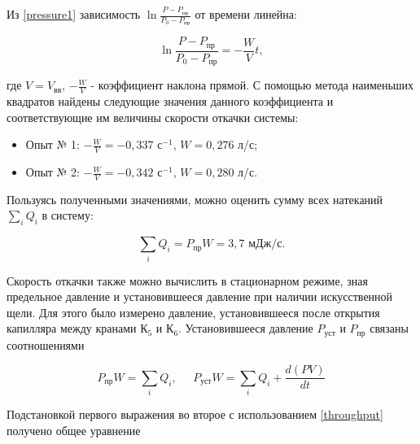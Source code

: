 \documentclass[a4paper,12pt]{article} %
\begin{document}

Из \eqref{pressure1} зависимость $ \ln{\frac{P - P_\text{пр}}{P_0 - P_\text{пр}}} $ от времени линейна:

\begin{equation}
    \ln{\frac{P - P_\text{пр}}{P_0 - P_\text{пр}}} = -\frac{W}{V}t,
\end{equation}

где $ V = V_\text{вв}$, $-\frac{W}{V}$ - коэффициент наклона прямой. С помощью метода наименьших квадратов найдены следующие значения данного коэффициента и соответствующие им величины скорости откачки системы:

\begin{itemize}
    \item Опыт № 1: $-\frac{W}{V} = -0,337 \text{ с}^{-1}$, $W = 0,276 $ л/с;
    \item Опыт № 2: $-\frac{W}{V} = -0,342 \text{ с}^{-1}$, $W = 0,280 $ л/с.
\end{itemize}

Пользуясь полученными значениями, можно оценить сумму всех натеканий $\sum\limits_i Q_i$ в систему:

\begin{equation}
    \sum\limits_i Q_i = P_\text{пр}W = 3,7 \text{ мДж/с}.
\end{equation}

Скорость откачки также можно вычислить в стационарном режиме, зная предельное давление и установившееся давление при наличии искусственной щели. Для этого было измерено давление, установившееся после открытия капилляра между кранами $\text{К}_5$ и $\text{К}_6$. Установившееся давление $P_\text{уст}$ и $P_\text{пр}$ связаны соотношениями

\begin{equation}
    P_\text{пр}W = \sum\limits_i Q_i, \;\;\;\;\; %
    P_\text{уст}W = \sum\limits_i Q_i + \frac{d(PV)}{dt}
\end{equation}

Подстановкой первого выражения во второе с использованием \eqref{throughput} получено общее уравнение
\end{document}
